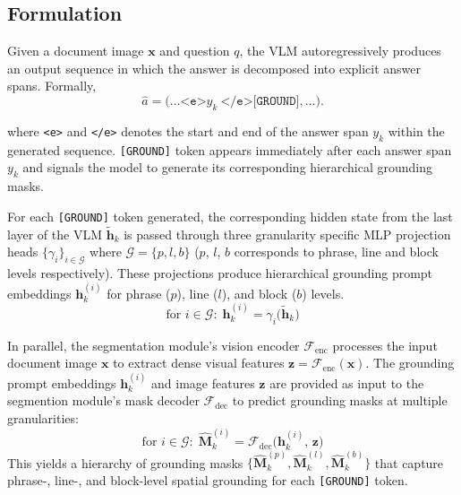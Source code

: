 \subsection{Formulation}

Given a document image $\mathbf{x}$ and question $q$, the VLM autoregressively produces an output sequence in which the answer is decomposed into explicit answer spans.
Formally,
\begin{equation}
\hat{a} = 
\bigl(\ldots
\texttt{<e>}y_k~\texttt{</e>}\texttt{[GROUND]},
\ldots \bigr).
\end{equation}

\noindent
where 
\texttt{<e>} and \texttt{</e>} denotes the start and end of the answer span $y_k$ within the generated sequence. \texttt{[GROUND]} token appears immediately after each answer span $y_k$ and signals the model to generate its corresponding hierarchical grounding masks.


For each \texttt{[GROUND]} token generated, the corresponding hidden state from the last layer of the VLM $\tilde{\mathbf{h}}_k$ is passed through three granularity specific MLP projection heads $\{\gamma_i\}_{i\in\mathcal{G}}$ where $\mathcal{G}=\{p,l,b\}$ ($p$, $l$, $b$ corresponds to phrase, line and block levels respectively).
These projections produce hierarchical grounding prompt embeddings $\mathbf{h}^{(i)}_k$ for phrase ($p$), line ($l$), and block ($b$) levels. 
\begin{equation}
\text{for } i \in \mathcal{G}:\;
\mathbf{h}^{(i)}_k = \gamma_i\big(\tilde{\mathbf{h}}_k\big)
\end{equation}

In parallel, the segmentation module's vision encoder $\mathcal{F}_{\text{enc}}$ processes the input document image $\mathbf{x}$ to extract dense visual features $\mathbf{z}= \mathcal{F}_{\text{enc}}(\mathbf{x})$. 
The grounding prompt embeddings ${\mathbf{h}^{(i)}_k}$ and image features $\mathbf{z}$ are provided as input to the segmention module's mask decoder $\mathcal{F}_{\text{dec}}$ to predict grounding masks at multiple granularities:
\begin{equation}
\text{for } i \in \mathcal{G}:\; 
\hat{\mathbf{M}}^{(i)}_k = \mathcal{F}_{\text{dec}}\big(\mathbf{h}^{(i)}_k,\, \mathbf{z}\big)
\end{equation}
This yields a hierarchy of grounding masks \(\{\hat{\mathbf{M}}_k^{(p)}, \hat{\mathbf{M}}_k^{(l)}, \hat{\mathbf{M}}_k^{(b)}\}\) that capture phrase-, line-, and block-level spatial grounding for each \texttt{[GROUND]} token.


